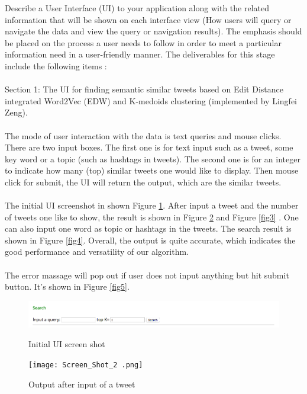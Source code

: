 \documentclass[10pt]{article}
\begin{document}
\textnormal{
Describe a User Interface (UI) to your application along with the related information that will be shown on each interface view (How users will query or navigate the data and view the query or navigation results). The emphasis should be placed on the process a user needs to follow in order to meet a particular information need in a user-friendly manner.
The deliverables for this stage include the following items :\\\\
Section 1: The UI for finding semantic similar tweets based on Edit Distance integrated Word2Vec (EDW) and K-medoids clustering (implemented by Lingfei Zeng).\\\\
The mode of user interaction with the data is text queries and mouse clicks. There are two input boxes. The first one is for text input such as a tweet, some key word or a topic (such as hashtags in tweets). The second one is for an integer to indicate how many (top) similar tweets one would like to display. Then mouse click for submit, the UI will return the output, which are the similar tweets. \\\\
The initial UI screenshot in shown Figure \ref{fig1}. After input a tweet and the number of tweets one like to show, the result is shown in Figure \ref{fig2} and Figure \ref{fig3} . One can also input one word as topic or hashtags in the tweets. The search result is shown in  Figure \ref{fig4}. Overall, the output is quite accurate, which indicates the good performance and versatility of our algorithm. \\\\
The error massage will pop out if user does not input anything but hit submit button. It's shown in Figure \ref{fig5}.   
}

 
\begin{figure}[h]
	\caption{Initial UI screen shot}
	\centering
	\includegraphics[scale=0.3]{Screen_Shot_1.png}
	\label{fig1}
\end{figure}

\begin{figure}[h]
	\caption{Output after input of a tweet}
	\centering
	\texttt{[image: Screen\_Shot\_2 .png]}
	\label{fig2}
\end{figure}
\end{document}
